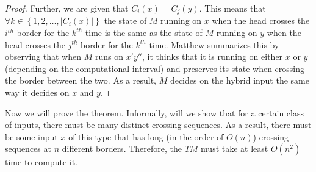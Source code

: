 \documentclass[usletter]{article}
\begin{document}
\begin{proof}
    Further, we are given that \(C_i(x) = C_j(y)\). This means that \(\forall k \in \left\{1,2,\ldots, |C_i(x)| \right\}\) the state of \(M\) running on \(x\) when the head crosses the \(i^{th}\) border for the \(k^{th}\) time is the same
    as the state of \(M\) running on \(y\) when the head crosses the \(j^{th}\) border for the \(k^{th}\) time. Matthew summarizes this by observing that when \(M\) runs on \(x'y''\), it thinks that it is running on either \(x\) 
    or \(y\) (depending on the computational interval) and preserves its state when crossing the border between the two. As a result, \(M\) decides on the hybrid input the same way it decides on \(x\) and \(y\).
\end{proof}

Now we will prove the theorem. Informally, will we show that for a certain class of inputs, there must be many distinct crossing sequences. 
As a result, there must be some input \(x\) of this type that has long (in the order of \(O(n)\)) crossing sequences at \(n\) different borders. Therefore, 
the \(TM\) must take at least \(O(n^2)\) time to compute it.
\end{document}
